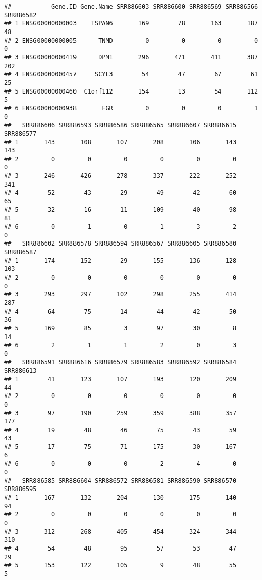 \documentclass[
]{article}
\begin{document}
\begin{verbatim}
##           Gene.ID Gene.Name SRR886603 SRR886600 SRR886569 SRR886566 SRR886582
## 1 ENSG00000000003    TSPAN6       169        78       163       187        48
## 2 ENSG00000000005      TNMD         0         0         0         0         0
## 3 ENSG00000000419      DPM1       296       471       411       387       202
## 4 ENSG00000000457     SCYL3        54        47        67        61        25
## 5 ENSG00000000460  C1orf112       154        13        54       112         5
## 6 ENSG00000000938       FGR         0         0         0         1         0
##   SRR886606 SRR886593 SRR886586 SRR886565 SRR886607 SRR886615 SRR886577
## 1       143       108       107       208       106       143       143
## 2         0         0         0         0         0         0         0
## 3       246       426       278       337       222       252       341
## 4        52        43        29        49        42        60        65
## 5        32        16        11       109        40        98        81
## 6         0         1         0         1         3         2         0
##   SRR886602 SRR886578 SRR886594 SRR886567 SRR886605 SRR886580 SRR886587
## 1       174       152        29       155       136       128       103
## 2         0         0         0         0         0         0         0
## 3       293       297       102       298       255       414       287
## 4        64        75        14        44        42        50        36
## 5       169        85         3        97        30         8        14
## 6         2         1         1         2         0         3         0
##   SRR886591 SRR886616 SRR886579 SRR886583 SRR886592 SRR886584 SRR886613
## 1        41       123       107       193       120       209        44
## 2         0         0         0         0         0         0         0
## 3        97       190       259       359       388       357       177
## 4        19        48        46        75        43        59        43
## 5        17        75        71       175        30       167         6
## 6         0         0         0         2         4         0         0
##   SRR886585 SRR886604 SRR886572 SRR886581 SRR886590 SRR886570 SRR886595
## 1       167       132       204       130       175       140        94
## 2         0         0         0         0         0         0         0
## 3       312       268       405       454       324       344       310
## 4        54        48        95        57        53        47        29
## 5       153       122       105         9        48        55         5

\end{verbatim}
\end{document}
